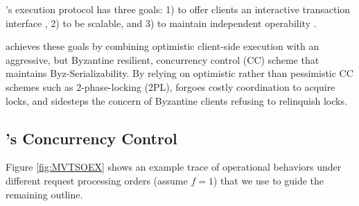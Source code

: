 
\sys{}'s execution protocol has three goals: 1) to offer clients an interactive transaction interface , 2) to be scalable, and 3) to maintain independent operability .

\sys{} achieves these goals by combining optimistic client-side execution with an aggressive, but Byzantine resilient, concurrency control (CC) scheme that maintains Byz-Serializability. 
By relying on optimistic rather than pessimistic CC schemes such as 2-phase-locking (2PL), \sys{} forgoes costly coordination to acquire locks, and sidesteps the concern of Byzantine clients refusing to relinquish locks.

\subsection{\sys{}'s Concurrency Control}

 
Figure \ref{fig:MVTSOEX} shows an example trace of \sys operational behaviors under different request processing orders (assume $f=1$) that we use to guide the remaining outline.

